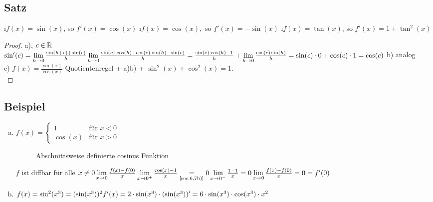 \subsection[Satz: Ableitungsregeln von cosinus und sinus]{Satz}
\begin{enumerate}[a)]
\i $f(x) = \sin(x)$, so $f'(x) = \cos(x)$
\i $f(x) = \cos(x),$ so $f'(x) = -\sin(x)$
\i $f(x) = \tan(x)$, so $f'(x) = 1 + \tan^2(x)$
\end{enumerate}
\begin{proof}
a), $c \in \mathbb{R}$\\
$\sin'(c) = \lim\limits_{h \to 0}\frac{\sin(h+c) + \sin(c)}{h}\\
\lim\limits_{h \to 0} \frac{\sin(c) \cdot \cos(h) + \cos(c) \cdot \sin(h) - \sin(c)}{h}\\
= \frac{\sin(c) \cdot \cos(h) -1}{h} + \lim\limits_{h \to 0} \frac{\cos(c)\sin(h)}{h} = \sin(c) \cdot 0 + \cos(c) \cdot 1 = \cos(c)$
b) analog\\
c) $f(x) = \frac{\sin(x)}{\cos(x)}$ Quotientenregel + a)b) + $\sin^2(x) + \cos^2(x) =1$.\\
\end{proof}
\subsection{Beispiel}
\begin{enumerate}[a)]
\item $f(x) = \begin{cases}
1 & \text{für }x < 0\\
\cos(x) & \text{für } x > 0
\end{cases}$\\
\begin{figure}[h!]
\centering
{}
\caption{Abschnittsweise definierte cosinus Funktion}
\end{figure}
$f$ ist diffbar für alle $ x \ne 0\\
\lim\limits_{x \to 0} \frac{f(x) - f(0)}{x}\\
\lim\limits_{x \to 0^+} \frac{\cos(x) -1}{x} \underset{\text{\ref{sec:6.7b)}}}{=} 0\\
\lim\limits_{x \to 0^-} \frac{1 -1 }{x} = 0\\
\lim\limits_{x \to 0} \frac{f(x) - f(0)}{x} = 0 = f'(0)$
\item $f(x) = \sin^2(x^3) = (\sin(x^3))^2\\
f'(x) = 2 \cdot \sin(x^3) \cdot (\sin(x^3))' = 6 \cdot \sin(x^3) \cdot \cos(x^3) \cdot x^2$\\
\end{enumerate}
